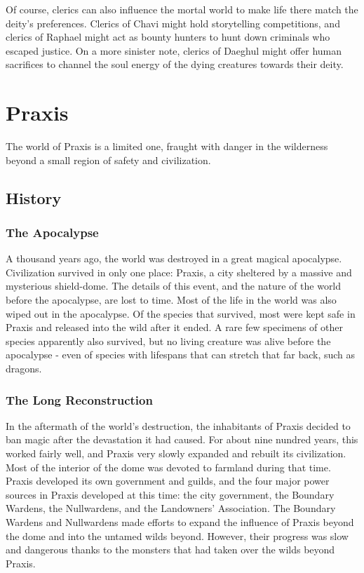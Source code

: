     Of course, clerics can also influence the mortal world to make life there match the deity's preferences.
    Clerics of Chavi might hold storytelling competitions, and clerics of Raphael might act as bounty hunters to hunt down criminals who escaped justice.
    On a more sinister note, clerics of Daeghul might offer human sacrifices to channel the soul energy of the dying creatures towards their deity.

\section{Praxis}
  The world of Praxis is a limited one, fraught with danger in the wilderness beyond a small region of safety and civilization.

  \subsection{History}

    \subsubsection{The Apocalypse}
      A thousand years ago, the world was destroyed in a great magical apocalypse.
      Civilization survived in only one place: Praxis, a city sheltered by a massive and mysterious shield-dome.
      The details of this event, and the nature of the world before the apocalypse, are lost to time.
      Most of the life in the world was also wiped out in the apocalypse.
      Of the species that survived, most were kept safe in Praxis and released into the wild after it ended.
      A rare few specimens of other species apparently also survived, but no living creature was alive before the apocalypse - even of species with lifespans that can stretch that far back, such as dragons.

    \subsubsection{The Long Reconstruction}
      In the aftermath of the world's destruction, the inhabitants of Praxis decided to ban magic after the devastation it had caused.
      For about nine nundred years, this worked fairly well, and Praxis very slowly expanded and rebuilt its civilization.
      Most of the interior of the dome was devoted to farmland during that time.
      Praxis developed its own government and guilds, and the four major power sources in Praxis developed at this time: the city government, the Boundary Wardens, the Nullwardens, and the Landowners' Association.
      The Boundary Wardens and Nullwardens made efforts to expand the influence of Praxis beyond the dome and into the untamed wilds beyond.
      However, their progress was slow and dangerous thanks to the monsters that had taken over the wilds beyond Praxis.


